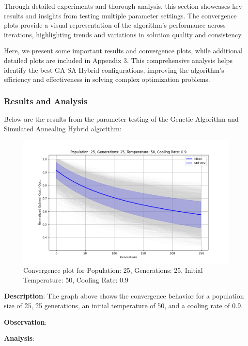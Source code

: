 \documentclass[
]{article}
\begin{document}
    Through detailed experiments and thorough analysis, this section showcases key results and insights from testing multiple parameter settings. The convergence plots provide a visual representation of the algorithm's performance across iterations, highlighting trends and variations in solution quality and consistency.

    Here, we present some important results and convergence plots, while additional detailed plots are included in Appendix 3. This comprehensive analysis helps identify the best GA-SA Hybrid configurations, improving the algorithm's efficiency and effectiveness in solving complex optimization problems.

    \subsubsection{Results and Analysis}
    Below are the results from the parameter testing of the Genetic Algorithm and Simulated Annealing Hybrid algorithm:

    \begin{figure}[H]
    \centering
    \includegraphics[width=\textwidth]{genetic_simulated_annealing_hybrid/Population_25_Generations_25_Temperature_50_CoolingRate_0.9}
    \caption{Convergence plot for Population: 25, Generations: 25, Initial Temperature: 50, Cooling Rate: 0.9}
    \label{fig:ga_sa_25_25_50_09}
\end{figure}

\textbf{Description}: The graph above shows the convergence behavior for a population size of 25, 25 generations, an initial temperature of 50, and a cooling rate of 0.9.

\textbf{Observation}:

\textbf{Analysis}:
\end{document}
